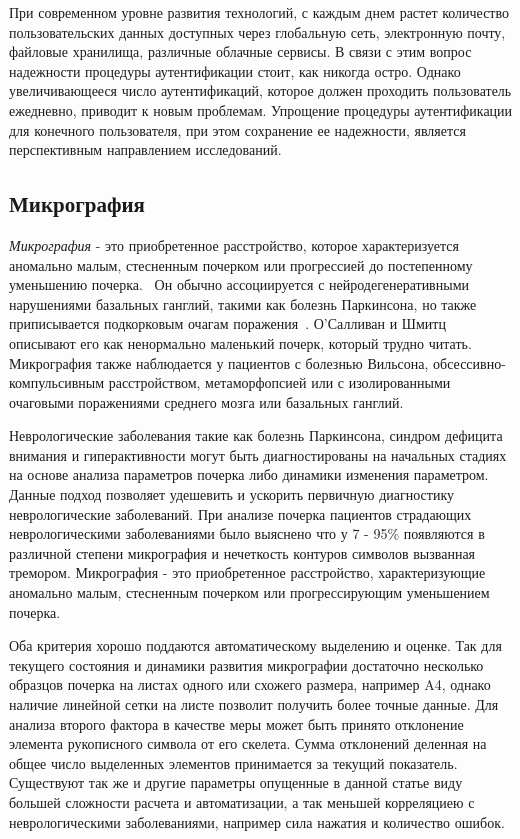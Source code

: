 При современном уровне развития технологий, с каждым днем растет количество пользовательских данных доступных через глобальную сеть, электронную почту, файловые хранилища, различные облачные сервисы. В связи с этим вопрос надежности процедуры аутентификации стоит, как никогда остро. Однако увеличивающееся число аутентификаций, которое должен проходить пользователь ежедневно, приводит к новым проблемам. Упрощение процедуры аутентификации для конечного пользователя, при этом сохранение ее надежности, является перспективным направлением исследований.

\subsection{Микрография}
\emph{Микрография} - это приобретенное расстройство, которое характеризуется аномально малым, стесненным почерком или прогрессией до постепенному уменьшению почерка.~\cite{larner_dict_neuro} Он обычно ассоциируется с нейродегенеративными нарушениями базальных ганглий, такими как болезнь Паркинсона, но также приписывается подкорковым очагам поражения~\cite{academic_press_movement_disorders}. О'Салливан и Шмитц описывают его как ненормально маленький почерк, который трудно читать.~\cite{o_sullivan} Микрография также наблюдается у пациентов с болезнью Вильсона, обсессивно-компульсивным расстройством, метаморфопсией или с изолированными очаговыми поражениями среднего мозга или базальных ганглий.~\cite{kinematic_hardwrittung_analysis}

Неврологические заболевания такие как болезнь Паркинсона, синдром дефицита внимания и гиперактивности могут быть диагностированы на начальных стадиях на основе анализа параметров почерка либо динамики изменения параметром. Данные подход позволяет удешевить и ускорить первичную диагностику неврологические заболеваний.
При анализе почерка пациентов страдающих неврологическими заболеваниями было выяснено что у 7 - 95\% появляются в различной степени микрография и нечеткость контуров символов вызванная тремором. Микрография - это приобретенное расстройство, характеризующие аномально малым, стесненным почерком или прогрессирующим уменьшением почерка.

Оба критерия хорошо поддаются автоматическому выделению и оценке. Так для текущего состояния и динамики развития микрографии достаточно несколько образцов почерка на листах одного или схожего размера, например A4, однако наличие линейной сетки на листе позволит получить более точные данные.
Для анализа второго фактора в качестве меры может быть принято отклонение элемента рукописного символа от его скелета. Сумма отклонений деленная на общее число выделенных элементов принимается за текущий показатель.
Существуют так же и другие параметры опущенные в данной статье виду большей сложности расчета и автоматизации, а так меньшей корреляциею с неврологическими заболеваниями, например сила нажатия и количество ошибок.

